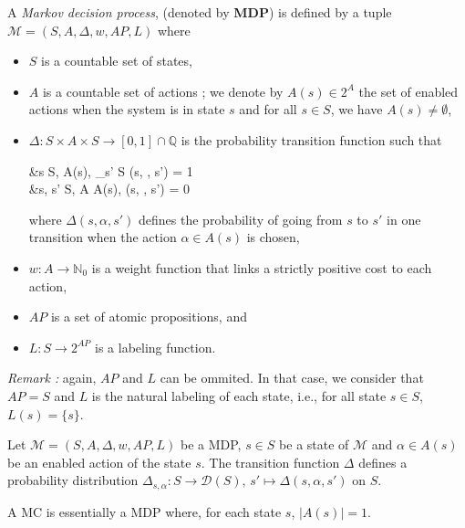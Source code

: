 \begin{definition}
	A \textit{Markov decision process}, (denoted by \textbf{MDP}) is defined by a tuple $\mathcal{M}  = (S, A, \Delta, w, AP, L)$ where
	\begin{itemize}
		\item $S$ is a countable set of states,
		\item $A$ is a countable set of actions ; we denote by $A(s) \in 2^A$  the set of enabled actions when the system is in state $s$ and for all $s \in S$,
    we have $A(s) \neq \emptyset$,
		\item $\Delta: S \times A \times S \rightarrow [0, 1] \cap \mathbb{Q}$ is the probability transition function such that
		\begin{flalign*}
			&\forall s \in S, \; \forall \alpha \in A(s), \; \sum_{s' \in S} \Delta(s, \alpha, s') = 1 \\
			 &\forall s, s' \in S, \; \forall \alpha \in A \setminus A(s), \; \Delta(s, \alpha, s') = 0
		\end{flalign*}

			where $\Delta(s, \alpha, s')$ defines the probability of going from $s$ to $s'$ in one transition when the action $\alpha \in A(s)$ is chosen,
    \item $w : A \rightarrow \mathbb{N}_0$ %
      is a weight function that links a strictly positive cost to each action,
    \item $AP$ is a set of atomic propositions, and
    \item $L : S \rightarrow 2^{AP}$ is a labeling function.
	\end{itemize}
  \textit{Remark : }again, $AP$ and $L$ can be ommited. In that case, we consider that $AP=S$ and $L$ is the natural labeling of each state, i.e., for all state $s \in S$, $L(s) = \{s\}$.
\end{definition}

\begin{property}
  Let $\mathcal{M} = (S,A, \Delta, w, AP, L)$ be a MDP, $s \in S$ be a state of $\mathcal{M}$ and $\alpha \in A(s)$ be an enabled action of the state $s$. The transition function $\Delta$ defines a probability distribution $\Delta_{s, \alpha} : S \rightarrow \mathcal{D}(S), \, s' \mapsto \Delta(s, \alpha, s')$ on $S$.
\end{property}
\begin{property}
  A MC is essentially a MDP where, for each state $s$, $|A(s)| = 1$.
\end{property}

